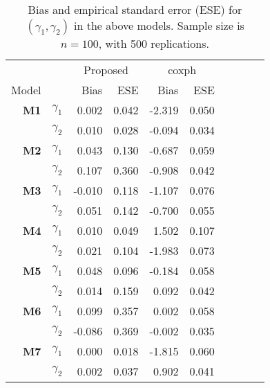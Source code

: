 \documentclass[a4paper,10pt]{article}
\begin{document}
\begin{table}[ht]
\centering
\caption{Bias and empirical standard error (ESE) for $(\gamma_1, \gamma_2)$ in the above models.
Sample size is $n = 100$, with 500 replications.}
\begin{tabular}{rrrrrrrrrr}
\toprule
&& \multicolumn{2}{c}{Proposed}
& \multicolumn{2}{c}{coxph}\\
\cmidrule(l){3-4}\cmidrule(l){5-6}
Model  & & Bias & ESE & Bias & ESE \\
\midrule
\textbf{M1} & $\gamma_1$ & 0.002 & 0.042 & -2.319 & 0.050 \\ 
 & $\gamma_2$ & 0.010 & 0.028 & -0.094 & 0.034 \\ 
\textbf{M2} & $\gamma_1$ & 0.043 & 0.130 & -0.687 & 0.059 \\ 
 & $\gamma_2$ & 0.107 & 0.360 & -0.908 & 0.042 \\ 
\textbf{M3} & $\gamma_1$ & -0.010 & 0.118 & -1.107 & 0.076 \\ 
 & $\gamma_2$ & 0.051 & 0.142 & -0.700 & 0.055 \\ 
\textbf{M4} & $\gamma_1$ & 0.010 & 0.049 & 1.502 & 0.107 \\ 
 & $\gamma_2$ & 0.021 & 0.104 & -1.983 & 0.073 \\ 
\textbf{M5} & $\gamma_1$ & 0.048 & 0.096 & -0.184 & 0.058 \\ 
 & $\gamma_2$ & 0.014 & 0.159 & 0.092 & 0.042 \\ 
\textbf{M6} & $\gamma_1$ & 0.099 & 0.357 & 0.002 & 0.058 \\ 
 & $\gamma_2$ & -0.086 & 0.369 & -0.002 & 0.035 \\ 
\textbf{M7} & $\gamma_1$ & 0.000 & 0.018 & -1.815 & 0.060 \\ 
 & $\gamma_2$ & 0.002 & 0.037 & 0.902 & 0.041 \\ 
\bottomrule
\end{tabular}
\end{table}
\end{document}
